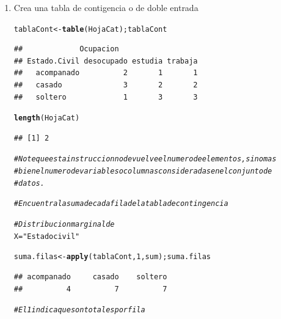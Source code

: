 \documentclass[12pt,letterpaper]{article}\usepackage[]{graphicx}\usepackage[]{color}
\makeatletter
\newcommand{\hlnum}[1]{\textcolor[rgb]{0.686,0.059,0.569}{#1}}%
\newcommand{\hlstr}[1]{\textcolor[rgb]{0.192,0.494,0.8}{#1}}%
\newcommand{\hlcom}[1]{\textcolor[rgb]{0.678,0.584,0.686}{\textit{#1}}}%
\newcommand{\hlstd}[1]{\textcolor[rgb]{0.345,0.345,0.345}{#1}}%
\newcommand{\hlkwb}[1]{\textcolor[rgb]{0.69,0.353,0.396}{#1}}%
\newcommand{\hlkwd}[1]{\textcolor[rgb]{0.737,0.353,0.396}{\textbf{#1}}}%
\newenvironment{kframe}{%
 \def\at@end@of@kframe{}%
 \ifinner\ifhmode%
  \def\at@end@of@kframe{\end{minipage}}%
  \begin{minipage}{\columnwidth}%
 \fi\fi%
 \def\FrameCommand##1{\hskip\@totalleftmargin \hskip-\fboxsep
 \colorbox{shadecolor}{##1}\hskip-\fboxsep
     \hskip-\linewidth \hskip-\@totalleftmargin \hskip\columnwidth}%
 \MakeFramed {\advance\hsize-\width
   \@totalleftmargin\z@ \linewidth\hsize
   \@setminipage}}%
 {\par\unskip\endMakeFramed%
 \at@end@of@kframe}
\newenvironment{knitrout}{}{} %
\makeatother
\begin{document}
\begin{enumerate}
\item Crea una tabla de contigencia o de doble entrada
\begin{knitrout}
\color{fgcolor}\begin{kframe}
\begin{alltt}
\hlstd{tablaCont} \hlkwb{<-} \hlkwd{table}\hlstd{(HojaCat); tablaCont}
\end{alltt}
\begin{verbatim}
##             Ocupacion
## Estado.Civil desocupado estudia trabaja
##   acompanado          2       1       1
##   casado              3       2       2
##   soltero             1       3       3
\end{verbatim}
\begin{alltt}
\hlkwd{length}\hlstd{(HojaCat)}
\end{alltt}
\begin{verbatim}
## [1] 2
\end{verbatim}
\begin{alltt}
\hlcom{# Note que esta instruccion no devuelve el numero de elementos, sino mas}
\hlcom{# bien el numero de variables o columnas consideradas en el conjunto de}
\hlcom{# datos. }
\end{alltt}
\end{kframe}
\end{knitrout}

\begin{knitrout}
\color{fgcolor}\begin{kframe}
\begin{alltt}
\hlcom{# Encuentra la suma de cada fila de la tabla de contingencia }

\hlcom{# Distribucion marginal de }
\hlstd{X}\hlkwb{=}\hlstr{"Estado civil"}

\hlstd{suma.filas} \hlkwb{<-} \hlkwd{apply}\hlstd{(tablaCont,} \hlnum{1}\hlstd{, sum); suma.filas}
\end{alltt}
\begin{verbatim}
## acompanado     casado    soltero 
##          4          7          7
\end{verbatim}
\begin{alltt}
\hlcom{# El 1 indica que son totales por fila }
\end{alltt}
\end{kframe}
\end{knitrout}


\end{enumerate}
\end{document}
